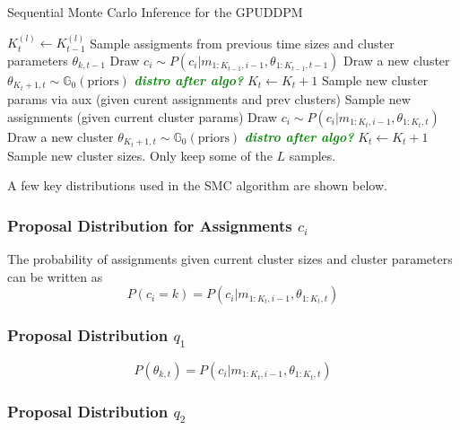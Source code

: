 \documentclass[smallcondensed, final]{svjour3}
\newcommand{\willie}[1]{\textcolor{green}{\textsf{\emph{\textbf{\textcolor{green}{#1}}}}}}
\begin{document}
\begin{algorithm}
\caption{Sequential Monte Carlo Inference for the GPUDDPM}
\label{alg:SMC}
\begin{algorithmic}[1]
\STATE $K_{t}^{(l)}  \leftarrow K_{t-1}^{(l)}$
\STATE Sample assigments from previous time sizes and cluster parameters $\theta_{k,t-1}$
\STATE Draw $c_{i} \sim P(c_{i} | m_{1:K_{t-1}, i-1}, \theta_{1:K_{t-1}, t-1} )$
\STATE Draw a new cluster $\theta_{K_{t}+1,t} \sim \mathbb{G}_{0}(\text{priors})$   \willie{distro after algo?}
\STATE $K_{t} \leftarrow K_{t} + 1$
\ENDIF
\ENDFOR
{}
\STATE Sample new cluster params via aux (given curent assignments and prev clusters)
\ENDFOR
{}
\STATE Sample new assignments (given current cluster params)
\STATE Draw $c_{i} \sim P(c_{i} | m_{1:K_{t}, i-1}, \theta_{1:K_{t}, t} )$
\STATE Draw a new cluster $\theta_{K_{t}+1,t} \sim \mathbb{G}_{0}(\text{priors})$   \willie{distro after algo?}
\STATE $K_{t} \leftarrow K_{t} + 1$
\ENDIF
\ENDFOR
\STATE Sample new cluster sizes.
\ENDFOR
\ENDFOR
\STATE Only keep some of the $L$ samples.
\ENDFOR
\end{algorithmic}
\end{algorithm}

A few key distributions used in the SMC algorithm are shown below.

\subsubsection{Proposal Distribution for Assignments $c_{i}$}
The probability of assignments given current cluster sizes and cluster parameters can be written as
\begin{equation}
P(c_{i} = k) = P(c_{i} | m_{1:K_{t}, i-1}, \theta_{1:K_{t}, t} )
\end{equation}


\subsubsection{Proposal Distribution $q_{1}$}

\begin{equation}
P(\theta_{k,t}) = P(c_{i} | m_{1:K_{t}, i-1}, \theta_{1:K_{t}, t} )
\end{equation}


\subsubsection{Proposal Distribution $q_{2}$}
\end{document}
